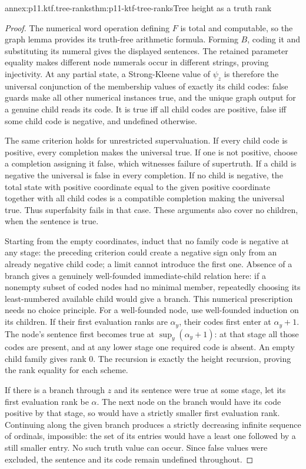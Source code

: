 \begin{annexitem}{annex:p11.ktf.tree-ranks}{thm:p11-ktf-tree-ranks}{Tree height as a truth rank}
\begin{proof}
The numerical word operation defining \(F\) is total and computable,
so the graph lemma provides its truth-free arithmetic formula. Forming
\(B\), coding it and substituting its numeral gives the displayed
sentences. The retained parameter equality makes different node
numerals occur in different strings, proving injectivity. At any
partial state, a Strong-Kleene value of \(\psi_z\) is therefore
the universal conjunction of the membership values of exactly its
child codes: false guards make all other numerical instances true,
and the unique graph output for a genuine child reads its code.
It is true iff all child codes are positive, false iff some child
code is negative, and undefined otherwise.

The same criterion holds for unrestricted supervaluation. If every
child code is positive, every completion makes the universal true.
If one is not positive, choose a completion assigning it false,
which witnesses failure of supertruth. If a child is negative the
universal is false in every completion. If no child is negative,
the total state with positive coordinate equal to the given positive
coordinate together with all child codes is a compatible completion
making the universal true. Thus superfalsity fails in that case.
These arguments also cover no children, when the sentence is true.

Starting from the empty coordinates, induct that no family code is
negative at any stage: the preceding criterion could create a
negative sign only from an already negative child code; a limit
cannot introduce the first one. Absence of a branch gives a genuinely
well-founded immediate-child relation here: if a nonempty subset of coded
nodes had no minimal member, repeatedly choosing its least-numbered
available child would give a branch. This numerical prescription needs
no choice principle. For a well-founded node, use well-founded
induction on its children. If their first evaluation
ranks are \(\alpha_y\), their codes first enter at
\(\alpha_y+1\). The node's sentence first becomes true at
\(\sup_y(\alpha_y+1)\): at that stage all those codes are present,
and at any lower stage one required code is absent. An empty
child family gives rank \(0\). The recursion is exactly the height
recursion, proving the rank equality for each scheme.

If there is a branch through \(z\) and its sentence were true at
some stage, let its first evaluation rank be \(\alpha\). The
next node on the branch would have its code positive by that stage,
so would have a strictly smaller first evaluation rank. Continuing
along the given branch produces a strictly decreasing infinite
sequence of ordinals, impossible: the set of its entries would
have a least one followed by a still smaller entry. No such truth
value can occur. Since false values were excluded, the sentence
and its code remain undefined throughout.
\end{proof}
\end{annexitem}

